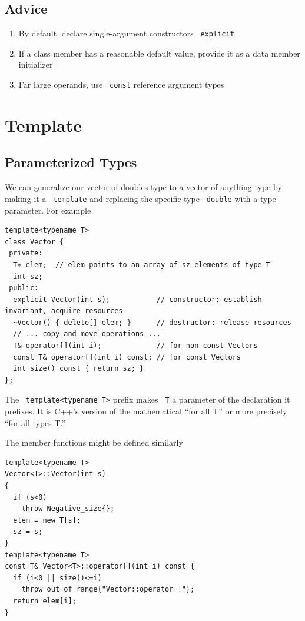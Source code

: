 \documentclass[11pt]{article}
\let\OldTexttt\texttt
\renewcommand{\texttt}[1]{\OldTexttt{\color{MidnightBlue} #1}}
\begin{document}
\subsection{Advice}
\label{sec:orgabd706d}
\begin{enumerate}
\item By default, declare single-argument constructors \texttt{explicit}
\item If a class member has a reasonable default value, provide it as a data member initializer
\item Far large operands, use \texttt{const} reference argument types
\end{enumerate}
\section{Template}
\label{sec:org61add8a}
\subsection{Parameterized Types}
\label{sec:org5836c97}
We can generalize our vector-of-doubles type to a vector-of-anything type by making it a
\texttt{template} and replacing the specific type \texttt{double} with a type parameter. For example
\begin{verbatim}
template<typename T>
class Vector {
 private:
  T∗ elem;  // elem points to an array of sz elements of type T
  int sz;
 public:
  explicit Vector(int s);           // constructor: establish invariant, acquire resources
  ~Vector() { delete[] elem; }      // destructor: release resources
  // ... copy and move operations ...
  T& operator[](int i);             // for non-const Vectors
  const T& operator[](int i) const; // for const Vectors
  int size() const { return sz; }
};
\end{verbatim}

The \texttt{template<typename T>} prefix makes \texttt{T} a parameter of the declaration it prefixes. It is C++'s
version of the mathematical ``for all T'' or more precisely ``for all types T.''

The member functions might be defined similarly
\begin{verbatim}
template<typename T>
Vector<T>::Vector(int s)
{
  if (s<0)
    throw Negative_size{};
  elem = new T[s];
  sz = s;
}
template<typename T>
const T& Vector<T>::operator[](int i) const {
  if (i<0 || size()<=i)
    throw out_of_range{"Vector::operator[]"};
  return elem[i];
}
\end{verbatim}
\end{document}

